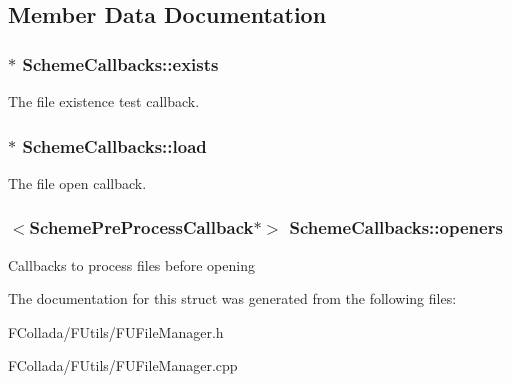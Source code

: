 \subsection{Member Data Documentation}
\hypertarget{structSchemeCallbacks_a911c7c4e197a9fbe00364e1f0bf20200}{
\subsubsection[{exists}]{$\ast$ {\bf SchemeCallbacks::exists}}}
\label{structSchemeCallbacks_a911c7c4e197a9fbe00364e1f0bf20200}
The file existence test callback. \hypertarget{structSchemeCallbacks_abb6b2030a834466fc6f3673916ad8f59}{
\subsubsection[{load}]{$\ast$ {\bf SchemeCallbacks::load}}}
\label{structSchemeCallbacks_abb6b2030a834466fc6f3673916ad8f59}
The file open callback. \hypertarget{structSchemeCallbacks_a8cb30bfc775cd2611484f995fdcff798}{
\subsubsection[{openers}]{$<${\bf SchemePreProcessCallback}$\ast$$>$ {\bf SchemeCallbacks::openers}}}
\label{structSchemeCallbacks_a8cb30bfc775cd2611484f995fdcff798}
Callbacks to process files before opening 

The documentation for this struct was generated from the following files:\begin{DoxyCompactItemize}
\item 
FCollada/FUtils/FUFileManager.h\item 
FCollada/FUtils/FUFileManager.cpp\end{DoxyCompactItemize}
